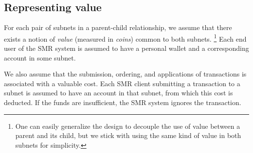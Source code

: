 \subsection{Representing value}

For each pair of subnets in a parent-child relationship, we assume that there exists a notion of \emph{value} (measured in \emph{coins}) common to both subnets.%
\footnote{One can easily generalize the design to decouple the use of value between a parent and its child, but we stick with using the same kind of value in both subnets for simplicity.}
Each end user of the SMR system is assumed to have a personal wallet and a corresponding account in some subnet.

We also assume that the submission, ordering, and applications of transactions is associated with a valuable cost.
Each SMR client submitting a transaction to a subnet is assumed to have an account in that subnet, from which this cost is deducted.
If the funds are insufficient, the SMR system ignores the transaction.